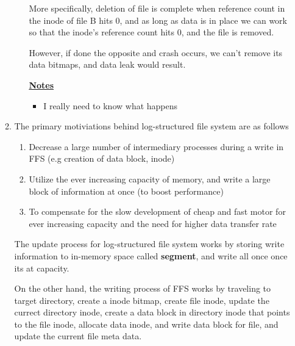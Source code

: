 \documentclass[12pt]{article}
\begin{document}
\begin{enumerate}[1.]
\begin{enumerate}[1)]
\begin{enumerate}[i)]
            \bigskip

            More specifically, deletion of file is complete when reference count in the inode of
            file B hits 0, and as long as data is in place we can work so that the inode's
            reference count hits 0, and the file is removed.

            \bigskip

            However, if done the opposite and crash occurs, we can't remove its data bitmaps,
            and data leak would result.

            \bigskip

            \underline{\textbf{Notes}}

            \begin{itemize}
                \item I really need to know what happens
            \end{itemize}
        \end{enumerate}

        \item

        The primary motiviations behind log-structured file system are as follows

        \begin{enumerate}[1.]
            \item Decrease a large number of intermediary processes during a write in FFS (e.g creation of data block, inode)
            \item Utilize the ever increasing capacity of memory, and write a large block of information at once (to boost performance)
            \item To compensate for the slow development of cheap and fast motor for ever increasing capacity and the need for higher data transfer rate
        \end{enumerate}

        \bigskip

        The update process for log-structured file system works by storing write information
        to in-memory space called \textbf{segment}, and write all once once its at capacity.

        \bigskip

        On the other hand, the writing process of FFS works by traveling to target directory,
        create a inode bitmap, create file inode, update the currect directory inode, create
        a data block in directory inode that points to the file inode, allocate data inode,
        and write data block for file, and update the current file meta data.


\end{enumerate}
\end{enumerate}
\end{document}
